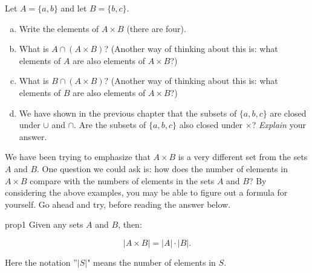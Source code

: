 \begin{exercise}{7}
Let $A = \{a,b\}$ and let $B = \{b,c\}$.
\begin{enumerate}[(a)]
\item
Write the elements of $A \times B$ (there are four).
\item 
What is $A \cap (A \times B)$? (Another way of thinking about this is: what elements of $A$ are also elements of $A \times B$?)
\item 
What is $B \cap (A \times B)$? (Another way of thinking about this is: what elements of $B$ are also elements of $A \times B$?)
\item
We have shown in the previous chapter that the subsets of $\{a,b,c\}$ are closed under $\cup$ and $\cap$. Are the subsets of $\{a,b,c\}$ also closed under $\times$? \emph{Explain} your answer.
\end{enumerate}
\end{exercise}

We have been trying to emphasize that $A \times B$ is a very different set from the sets $A$ and $B$.  One question we could ask is: how does the number of elements in $A \times B$ compare with the numbers of elements in the sets $A$ and $B$?  By considering the above examples, you may be able to figure out a formula for yourself.  Go ahead and try, before reading the answer below.

\begin{prop}{prop1}
Given any sets $A$ and $B$, then:

\[  |A \times B|= |A| \cdot |B|. \]

Here the notation ''$|S|$" means the number of elements in $S$.
\end{prop}

